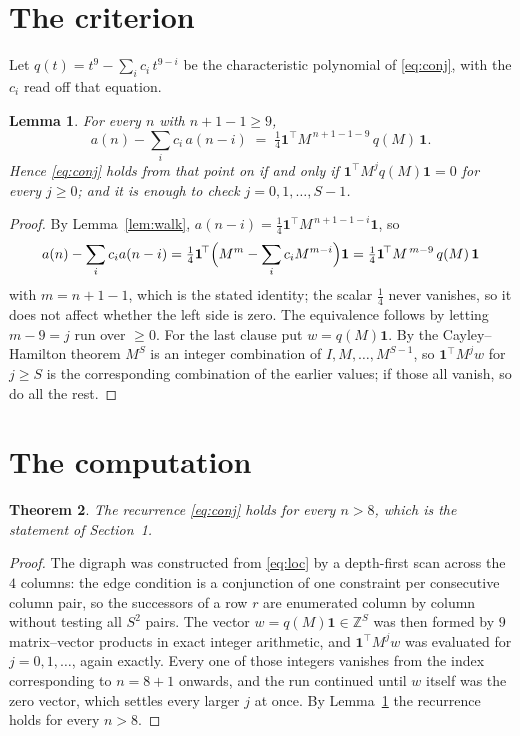 \documentclass[11pt,a4paper]{article}
\theoremstyle{plain}
\newtheorem{theorem}{Theorem}
\newtheorem{lemma}[theorem]{Lemma}
\theoremstyle{definition}
\begin{document}
\section{The criterion}

Let $q(t)=t^{9}-\sum_i c_i\,t^{9-i}$ be the characteristic polynomial of
\eqref{eq:conj}, with the $c_i$ read off that equation.

\begin{lemma}\label{lem:crit}
For every $n$ with $n+1-1\ge9$,
\[
a(n)-\sum_i c_i\,a(n-i)\;=\;\tfrac1{4}\mathbf{1}^{\!\top}M^{\,n+1-1-9}\,q(M)\,\mathbf{1} .
\]
Hence \eqref{eq:conj} holds from that point on if and only if
$\mathbf{1}^{\!\top}M^{j}q(M)\mathbf{1}=0$ for every $j\ge0$; and it is enough to check
$j=0,1,\dots,S-1$.
\end{lemma}

\begin{proof}
By Lemma~\ref{lem:walk}, $a(n-i)=\tfrac1{4}\mathbf{1}^{\!\top}M^{\,n+1-1-i}\mathbf{1}$, so
\[
a(n)-\sum_i c_i a(n-i)
=\tfrac1{4}\mathbf{1}^{\!\top}\Bigl(M^{m}-\sum_i c_i M^{m-i}\Bigr)\mathbf{1}
=\tfrac1{4}\mathbf{1}^{\!\top}M^{\,m-9}\,q(M)\,\mathbf{1}
\]
with $m=n+1-1$, which is the stated identity; the scalar $\tfrac1{4}$ never vanishes, so
it does not affect whether the left side is zero. The equivalence follows by letting
$m-9=j$ run over $\ge0$. For the last clause put $w=q(M)\mathbf{1}$. By the
Cayley--Hamilton theorem $M^{S}$ is an integer combination of $I,M,\dots,M^{S-1}$, so
$\mathbf{1}^{\!\top}M^{j}w$ for $j\ge S$ is the corresponding combination of the earlier
values; if those all vanish, so do all the rest.
\end{proof}

\section{The computation}

\begin{theorem}
The recurrence \eqref{eq:conj} holds for every $n>8$, which is the statement of
Section~1.
\end{theorem}

\begin{proof}
The digraph was constructed from \eqref{eq:loc} by a depth-first scan across the $4$
columns: the edge condition is a conjunction of one constraint per consecutive column
pair, so the successors of a row $r$ are enumerated column by column without testing all
$S^2$ pairs. The vector $w=q(M)\mathbf{1}\in\mathbb{Z}^{S}$ was then formed by $9$
matrix--vector products in exact integer arithmetic, and $\mathbf{1}^{\!\top}M^{j}w$ was
evaluated for $j=0,1,\dots$, again exactly. Every one of those integers vanishes from the
index corresponding to $n=8+1$ onwards, and the run continued until $w$ itself was the
zero vector, which settles every larger $j$ at once. By Lemma~\ref{lem:crit} the recurrence
holds for every $n>8$.
\end{proof}
\end{document}

